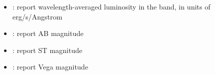 \documentclass[letterpaper,10pt,english]{sphinxmanual}
\begin{document}
\begin{itemize}
\begin{description}
\begin{itemize}
\item {} 
: report wavelength-averaged luminosity in the band, in units of erg/s/Angstrom

\item {} 
: report AB magnitude

\item {} 
: report ST magnitude

\item {} 
: report Vega magnitude

\end{itemize}

\end{description}

\end{itemize}
\end{document}
